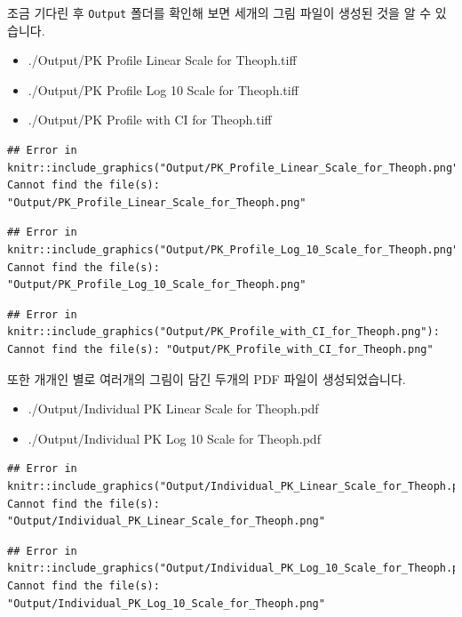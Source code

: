 \documentclass[
  11pt,
  krantz2, a4paper, twoside]{krantz}
\providecommand{\tightlist}{%
  \setlength{\itemsep}{0pt}\setlength{\parskip}{0pt}}
\begin{document}
조금 기다린 후 \texttt{Output} 폴더를 확인해 보면 세개의 그림 파일이 생성된 것을 알 수 있습니다.

\begin{itemize}
\tightlist
\item
  ./Output/PK Profile Linear Scale for Theoph.tiff
\item
  ./Output/PK Profile Log 10 Scale for Theoph.tiff
\item
  ./Output/PK Profile with CI for Theoph.tiff
\end{itemize}

\begin{verbatim}
## Error in knitr::include_graphics("Output/PK_Profile_Linear_Scale_for_Theoph.png"): Cannot find the file(s): "Output/PK_Profile_Linear_Scale_for_Theoph.png"
\end{verbatim}

\begin{verbatim}
## Error in knitr::include_graphics("Output/PK_Profile_Log_10_Scale_for_Theoph.png"): Cannot find the file(s): "Output/PK_Profile_Log_10_Scale_for_Theoph.png"
\end{verbatim}

\begin{verbatim}
## Error in knitr::include_graphics("Output/PK_Profile_with_CI_for_Theoph.png"): Cannot find the file(s): "Output/PK_Profile_with_CI_for_Theoph.png"
\end{verbatim}

또한 개개인 별로 여러개의 그림이 담긴 두개의 PDF 파일이 생성되었습니다.

\begin{itemize}
\tightlist
\item
  ./Output/Individual PK Linear Scale for Theoph.pdf
\item
  ./Output/Individual PK Log 10 Scale for Theoph.pdf
\end{itemize}

\begin{verbatim}
## Error in knitr::include_graphics("Output/Individual_PK_Linear_Scale_for_Theoph.png"): Cannot find the file(s): "Output/Individual_PK_Linear_Scale_for_Theoph.png"
\end{verbatim}

\begin{verbatim}
## Error in knitr::include_graphics("Output/Individual_PK_Log_10_Scale_for_Theoph.png"): Cannot find the file(s): "Output/Individual_PK_Log_10_Scale_for_Theoph.png"
\end{verbatim}
\end{document}
